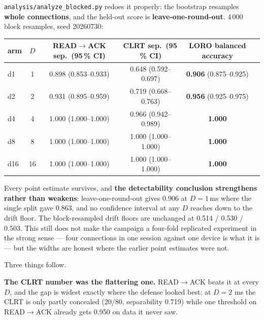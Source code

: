 \documentclass[10pt,a4paper,oneside]{article}
\newcommand{\num}[1]{\mbox{#1}}
\newcommand{\code}[1]{\texttt{\small #1}}
\begin{document}
\code{analysis/analyze\_blocked.py} redoes it properly: the bootstrap resamples
\textbf{whole connections}, and the held-out score is \textbf{leave-one-round-out}. 4\,000
block resamples, seed 20260730:

\begin{center}\small
\begin{tabular}{lccccc}
\toprule
\textbf{arm} & \textbf{$D$} & \textbf{READ$\to$ACK sep.\ (95\,\% CI)}
& \textbf{CLRT sep.\ (95\,\% CI)} & \textbf{LORO balanced accuracy} \\
\midrule
d1  & 1  & \num{0.898} (\num{0.853}--\num{0.933}) & \num{0.648} (\num{0.592}--\num{0.697}) & \textbf{\num{0.906}} (\num{0.875}--\num{0.925}) \\
d2  & 2  & \num{0.931} (\num{0.895}--\num{0.959}) & \num{0.719} (\num{0.668}--\num{0.763}) & \textbf{\num{0.956}} (\num{0.925}--\num{0.975}) \\
d4  & 4  & \num{1.000} (\num{1.000}--\num{1.000}) & \num{0.966} (\num{0.942}--\num{0.989}) & \textbf{\num{1.000}} \\
d8  & 8  & \num{1.000} (\num{1.000}--\num{1.000}) & \num{1.000} (\num{1.000}--\num{1.000}) & \textbf{\num{1.000}} \\
d16 & 16 & \num{1.000} (\num{1.000}--\num{1.000}) & \num{1.000} (\num{1.000}--\num{1.000}) & \textbf{\num{1.000}} \\
\bottomrule
\end{tabular}
\end{center}

Every point estimate survives, and \textbf{the detectability conclusion strengthens rather
than weakens}: leave-one-round-out gives \num{0.906} at $D=1$\,ms where the single split
gave \num{0.863}, and no confidence interval at any $D$ reaches down to the drift floor. The
block-resampled drift floors are unchanged at \num{0.514} / \num{0.530} / \num{0.503}. This
still does not make the campaign a four-fold replicated experiment in the strong sense ---
four connections in one session against one device is what it is --- but the widths are
honest where the earlier point estimates were not.

\medskip
Three things follow.

\textbf{The CLRT number was the flattering one.} READ$\to$ACK beats it at every $D$, and the
gap is widest exactly where the defense looked best: at $D=2$ ms the CLRT is only partly
concealed (20/80, separability \num{0.719}) while one threshold on READ$\to$ACK already gets
\num{0.950} on data it never saw.
\end{document}
